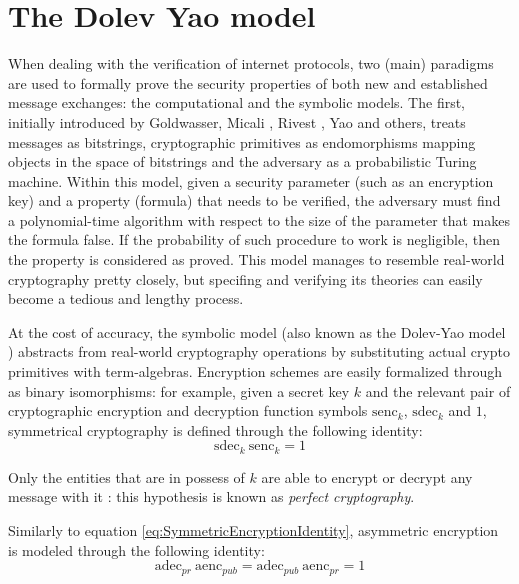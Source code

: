 \documentclass[fleqn,10pt]{SelfArx} %
\begin{document}
\section{The Dolev Yao model}\label{sec:SymbolicModel}

When dealing with the verification of internet protocols, two (main) paradigms are used to formally prove the security properties of both new and established message exchanges: the computational and the symbolic models. The first, initially introduced by Goldwasser, Micali \cite{goldwasser}, Rivest \cite{rivest}, Yao \cite{yao} and others, treats messages as bitstrings, cryptographic primitives as endomorphisms mapping objects in the space of bitstrings and the adversary as a probabilistic Turing machine. Within this model, given a security parameter (such as an encryption key) and a property (formula) that needs to be verified, the adversary must find a polynomial-time algorithm with respect to the size of the parameter that makes the formula false. If the probability of such procedure to work is negligible, then the property is considered as proved. This model manages to resemble real-world cryptography pretty closely, but specifing and verifying its theories can easily become a tedious and lengthy process.

At the cost of accuracy, the symbolic model (also known as the Dolev-Yao model \cite{DolevYao}) abstracts from real-world cryptography operations by substituting actual crypto primitives with term-algebras. Encryption schemes are easily formalized through as binary isomorphisms: for example, given a secret key $k$ and the relevant pair of cryptographic encryption and decryption function symbols $\textrm{senc}_k$, $\textrm{sdec}_k$ and $1$, symmetrical cryptography is defined through the following identity:
\begin{equation}\label{eq:SymmetricEncryptionIdentity}
    \textrm{sdec}_k\ \textrm{senc}_k = 1
\end{equation}

Only the entities that are in possess of $k$ are able to encrypt or decrypt any message with it \cite{BBSecurityProtocolVerification}: this hypothesis is known as \textit{perfect cryptography}.

Similarly to equation \ref{eq:SymmetricEncryptionIdentity}, asymmetric encryption is modeled through the following identity:
\begin{equation}\label{eq:AsymmetricEncryptionIdentity}
    \textrm{adec}_{pr}\ \textrm{aenc}_{pub} = \textrm{adec}_{pub}\ \textrm{aenc}_{pr} = 1
\end{equation}
\end{document}
